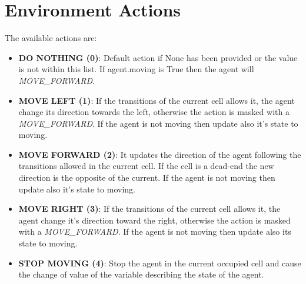 \section{Environment Actions}
\label{sec:envActions}
The available actions are:
\begin{itemize}
\item \textbf{DO NOTHING (0)}: Default action if None has been provided or the value is not within this list. If agent.moving is True then the agent will \textit{MOVE\_FORWARD}.

\item \textbf{MOVE LEFT (1)}: If the transitions of the current cell allows it, the agent change its direction towards the left, otherwise the action is masked with a \textit{MOVE\_FORWARD}. If the agent is not moving then update also it's state to moving.

\item \textbf{MOVE FORWARD (2)}: It updates the direction of the agent following the transitions allowed in the current cell. If the cell is a dead-end the new direction is the opposite of the current. If the agent is not moving then update also it's state to moving.

\item \textbf{MOVE RIGHT (3)}: If the transitions of the current cell allows it, the agent change it's direction toward the right, otherwise the action is masked with a \textit{MOVE\_FORWARD}. If the agent is not moving then update also its state to moving.

\item \textbf{STOP MOVING (4)}: Stop the agent in the current occupied cell and cause the change of value of the variable describing the state of the agent.

\end{itemize}
